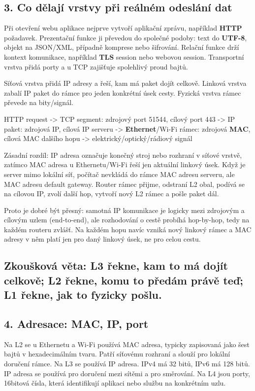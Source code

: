 \subsection*{3. Co dělají vrstvy při reálném odeslání dat}

Při otevření webu aplikace nejprve vytvoří aplikační zprávu, například \textbf{HTTP} požadavek. Prezentační funkce ji převedou do společné podoby: text do \textbf{UTF-8}, objekt na JSON/XML, případně komprese nebo šifrování. Relační funkce drží kontext komunikace, například \textbf{TLS} session nebo webovou session. Transportní vrstva přidá porty a u TCP zajišťuje spolehlivý proud bajtů.

Síťová vrstva přidá IP adresy a řeší, kam má paket dojít celkově. Linková vrstva zabalí IP paket do rámce pro jeden konkrétní úsek cesty. Fyzická vrstva rámec převede na bity/signál.

HTTP request -> TCP segment: zdrojový port 51544, cílový port 443 -> IP paket: zdrojová IP, cílová IP serveru -> \textbf{Ethernet}/Wi-Fi rámec: zdrojová \textbf{MAC}, cílová MAC dalšího hopu -> elektrický/optický/rádiový signál

Zásadní rozdíl: IP adresa označuje konečný stroj nebo rozhraní v síťové vrstvě, zatímco MAC adresa u Ethernetu/Wi-Fi řeší jen aktuální linkový úsek. Když je server mimo lokální síť, počítač nevkládá do rámce MAC adresu serveru, ale MAC adresu default gateway. Router rámec přijme, odstraní L2 obal, podívá se na cílovou IP, zvolí další hop, vytvoří nový L2 rámec a pošle paket dál.

Proto je dobré být přesný: samotná IP komunikace je logicky mezi zdrojovým a cílovým uzlem (end-to-end), ale rozhodování o cestě probíhá hop-by-hop, tedy na každém routeru zvlášť. Na každém hopu navíc vzniká nový linkový rámec a MAC adresy v něm platí jen pro daný linkový úsek, ne pro celou cestu.

\subsection*{Zkoušková věta: L3 řekne, kam to má dojít celkově; L2 řekne, komu to předám právě teď; L1 řekne, jak to fyzicky pošlu.}

\subsection*{4. Adresace: MAC, IP, port}

Na L2 se u Ethernetu a Wi-Fi používá MAC adresa, typicky zapisovaná jako šest bajtů v hexadecimálním tvaru. Patří síťovému rozhraní a slouží pro lokální doručení rámce. Na L3 se používá IP adresa. IPv4 má 32 bitů, IPv6 má 128 bitů. IP adresa se používá pro doručení mezi sítěmi a pro směrování. Na L4 jsou porty, 16bitová čísla, která identifikují aplikaci nebo službu na konkrétním uzlu.

